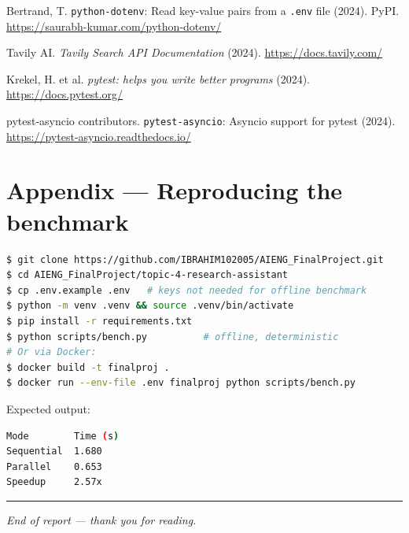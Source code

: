 \documentclass[11pt,a4paper]{article}
\begin{document}
\begin{enumerate}[label={[\arabic*]},leftmargin=2.4em,itemsep=2pt]
  \item Bertrand, T. \texttt{python-dotenv}: Read key-value pairs from a \texttt{.env} file (2024).
        PyPI. \url{https://saurabh-kumar.com/python-dotenv/}

  \item Tavily AI. \textit{Tavily Search API Documentation} (2024).
        \url{https://docs.tavily.com/}

  \item Krekel, H. et al. \textit{pytest: helps you write better programs} (2024).
        \url{https://docs.pytest.org/}
  \item pytest-asyncio contributors. \texttt{pytest-asyncio}: Asyncio support for pytest (2024).
        \url{https://pytest-asyncio.readthedocs.io/}

\end{enumerate}

\appendix
\section{Appendix --- Reproducing the benchmark}

\begin{lstlisting}[style=python,language=bash,numbers=none]
$ git clone https://github.com/IBRAHIM102005/AIENG_FinalProject.git
$ cd AIENG_FinalProject/topic-4-research-assistant
$ cp .env.example .env   # keys not needed for offline benchmark
$ python -m venv .venv && source .venv/bin/activate
$ pip install -r requirements.txt
$ python scripts/bench.py          # offline, deterministic
# Or via Docker:
$ docker build -t finalproj .
$ docker run --env-file .env finalproj python scripts/bench.py
\end{lstlisting}

Expected output:
\begin{lstlisting}[style=python,language=bash,numbers=none]
Mode        Time (s)
Sequential  1.680
Parallel    0.653
Speedup     2.57x
\end{lstlisting}

\vspace{1em}\hrule\vspace{0.6em}
\noindent\small\textit{End of report --- thank you for reading.}
\end{document}
